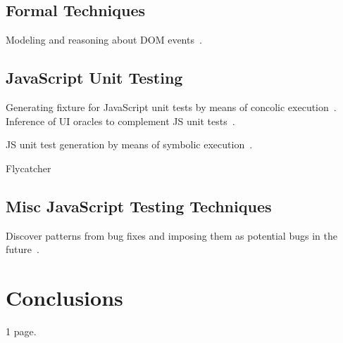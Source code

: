 \documentclass[sigconf]{acmart}
\begin{document}
\subsection{Formal Techniques}
\label{sub.sec.formal}

Modeling and reasoning about DOM events~\cite{lerner2012modeling}.

\subsection{JavaScript Unit Testing}
\label{sub.sec.js.unit.test}

Generating fixture for JavaScript unit tests by means of concolic execution~\cite{amin:ase15}. Inference of UI oracles to complement JS unit tests~\cite{icst16}.

JS unit test generation by means of symbolic execution~\cite{tanida2014automatic}.

Flycatcher~\cite{deautomatic}

\subsection{Misc JavaScript Testing Techniques}
\label{sub.sec.misc.test.tech}

Discover patterns from bug fixes and imposing them as potential bugs in the future~\cite{quinn:fse16}. 

\section{Conclusions}
\label{sec:concl}
1 page.


 
\end{document}
